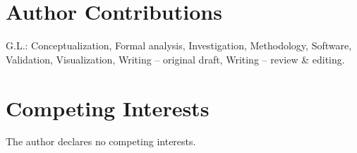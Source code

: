 \documentclass[
    Numbered,         %
]{sn-jnl}
\newif\ifNMIframing
\begin{document}





\ifNMIframing
\else
\fi

\ifNMIframing
\else
\fi





\section*{Author Contributions}
G.L.: Conceptualization, Formal analysis, Investigation, Methodology,
Software, Validation, Visualization, Writing -- original draft,
Writing -- review \& editing.

\section*{Competing Interests}
The author declares no competing interests.






\end{document}
